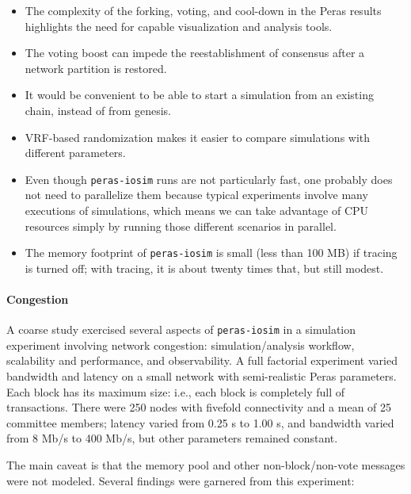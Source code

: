 \documentclass[10pt]{article}
\providecommand{\tightlist}{%
  \setlength{\itemsep}{0pt}\setlength{\parskip}{0pt}}
\begin{document}
\begin{itemize}
\tightlist
\item
  The complexity of the forking, voting, and cool-down in the Peras
  results highlights the need for capable visualization and analysis
  tools.
\item
  The voting boost can impede the reestablishment of consensus after a
  network partition is restored.
\item
  It would be convenient to be able to start a simulation from an
  existing chain, instead of from genesis.
\item
  VRF-based randomization makes it easier to compare simulations with
  different parameters.
\item
  Even though \texttt{peras-iosim} runs are not particularly fast, one
  probably does not need to parallelize them because typical experiments
  involve many executions of simulations, which means we can take
  advantage of CPU resources simply by running those different scenarios
  in parallel.
\item
  The memory footprint of \texttt{peras-iosim} is small (less than 100
  MB) if tracing is turned off; with tracing, it is about twenty times
  that, but still modest.
\end{itemize}

\paragraph{Congestion}\label{congestion}

A coarse study exercised several aspects of \texttt{peras-iosim} in a
simulation experiment involving network congestion: simulation/analysis
workflow, scalability and performance, and observability. A full
factorial experiment varied bandwidth and latency on a small network
with semi-realistic Peras parameters. Each block has its maximum size:
i.e., each block is completely full of transactions. There were 250
nodes with fivefold connectivity and a mean of 25 committee members;
latency varied from 0.25 s to 1.00 s, and bandwidth varied from 8 Mb/s
to 400 Mb/s, but other parameters remained constant.

The main caveat is that the memory pool and other non-block/non-vote
messages were not modeled. Several findings were garnered from this
experiment:
\end{document}
